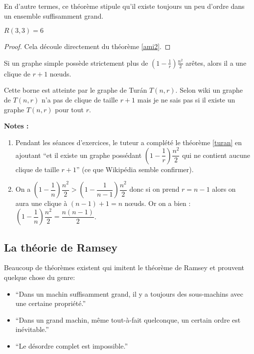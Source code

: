 \vspace{0.3cm}
En d'autre termes, ce théorème stipule qu'il existe toujours un peu d'ordre dans un ensemble suffisamment grand.

\begin{mytheo} 
  $R(3, 3) = 6$
  \begin{proof}
     Cela découle directement du théorème \ref{ami2}.
  \end{proof}
\end{mytheo}


\begin{mytheo}
 \label{turan}
Si un graphe simple possède strictement plus de $(1-\frac{1}{r})\frac{n^2}{2}$ arêtes, alors il a une clique de $r+1$ nœuds.
\end{mytheo}

Cette borne est atteinte par le graphe de Turán $T(n,r)$.  Selon wiki un graphe de $T(n,r)$ n'a pas de clique de taille $ r+1$ mais je ne sais pas si il existe un graphe $T(n,r)$ pour tout $r$.


\textbf{Notes :}
\begin{enumerate}
\item
Pendant les séances d'exercices, le tuteur a complété le théorème \ref{turan} en ajoutant ``et il existe un graphe possédant $\left( 1-\dfrac{1}{r} \right) \dfrac{n^2}{2}$ qui ne contient aucune clique de taille $r+1$'' (ce que Wikipédia semble confirmer).
\item
On a  $\left( 1-\dfrac{1}{n} \right) \dfrac{n^2}{2} > \left( 1-\dfrac{1}{n-1} \right) \dfrac{n^2}{2}$ donc si on prend $r=n-1$ alors on aura une clique à $(n-1)+1=n$ nœuds. Or on a bien : $\left( 1-\dfrac{1}{n} \right) \dfrac{n^2}{2} = \dfrac{n(n-1)}{2}$.
\end{enumerate}


\subsection{La théorie de Ramsey}
Beaucoup de théorèmes existent qui imitent le théorème de Ramsey et prouvent quelque chose du genre:
\begin{itemize}
\item
``Dans un machin suffisamment grand, il y a toujours des sous-machins avec une certaine propriété.''
\item
``Dans un grand machin, m\^eme tout-à-fait quelconque, un certain ordre est inévitable.''
\item
``Le désordre complet est impossible.''
\end{itemize}



